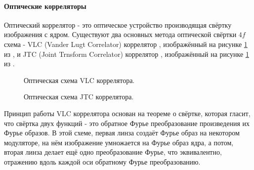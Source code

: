 \paragraph{Оптические корреляторы}
Оптический коррелятор - это оптическое устройство  производящая свёртку изображения с ядром. Существуют два основных метода оптической свёртки $4f$ схема - VLC (Vander Lugt Correlator) коррелятор \cite{lugt1964signal}, изображённый на рисунке \ref{ris:VLC} из \cite{goncharov2019features}, и JTC (Joint Trnsform Correlator) коррелятор \cite{weaver1966technique}, изображённый на рисунке \ref{ris:VLC} из \cite{alfalou2009optical}.
\begin{figure}[h]
	\caption{Оптическая схема VLC коррелятора.}
	\label{ris:VLC}
\end{figure}
\begin{figure}[h]
	\caption{Оптическая схема JTC коррелятора.}
	\label{ris:JTC}
\end{figure}
Принцип работы VLC коррелятора основан на теореме о свёртке, которая гласит, что свёртка двух функций - это обратное Фурье преобразование произведения их Фурье образов. В этой схеме, первая линза создаёт Фурье образ \cite{goodman2005introduction} на некотором модуляторе, на нём изображение умножается на Фурье образ ядра, а потом, вторая линза делает ещё одно преобразование Фурье, что эквивалентно, отражению вдоль каждой оси обратному Фурье преобразованию.
